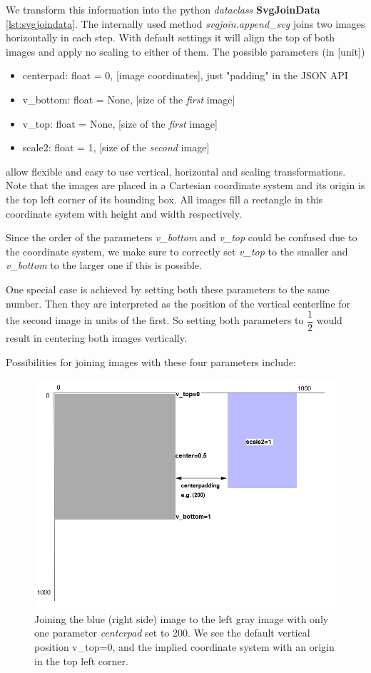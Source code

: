 \documentclass[a4paper, 12pt, bibliography=totoc]{scrartcl}
\begin{document}
We transform this information into the python \textit{dataclass} \textbf{SvgJoinData} \ref{lst:svgjoindata}.
The internally used method \textit{svgjoin.append\_svg} joins two images horizontally in each step.
With default settings it will align the top of both images and apply no scaling to either of them.
The possible parameters (in [unit])
\begin{itemize}
	\item centerpad: float = 0, [image coordinates], just "padding" in the JSON API
	\item v\_bottom: float = None, [size of the \textit{first} image]
	\item v\_top: float = None, [size of the \textit{first} image]
	\item scale2: float = 1, [size of the \textit{second} image]
\end{itemize}
allow flexible and easy to use vertical, horizontal and scaling transformations.
Note that the images are placed in a Cartesian coordinate system and its origin is the top left corner of its bounding box. All images fill a rectangle in this coordinate system with height and width respectively.

Since the order of the parameters \textit{v\_bottom} and \textit{v\_top} could be confused due to the coordinate system, we make sure to correctly set \textit{v\_top} to the smaller and \textit{v\_bottom} to the larger one if this is possible.

One special case is achieved by setting both these parameters to the same number. Then they are interpreted as the position of the vertical centerline for the second image in units of the first. So setting both parameters to $\dfrac{1}{2}$ would result in centering both images vertically.

Possibilities for joining images with these four parameters include:

\begin{figure}[H]
	\centering
	\includegraphics[width=0.8\linewidth]{images/svgjoinpad200.png}
	\caption{Joining the blue (right side) image to the left gray image with only one parameter \textit{centerpad} set to 200. We see the default vertical position v\_top=0, and the implied coordinate system with an origin in the top left corner.}
	\label{fig:svgjoinpad200}
\end{figure}
\end{document}
